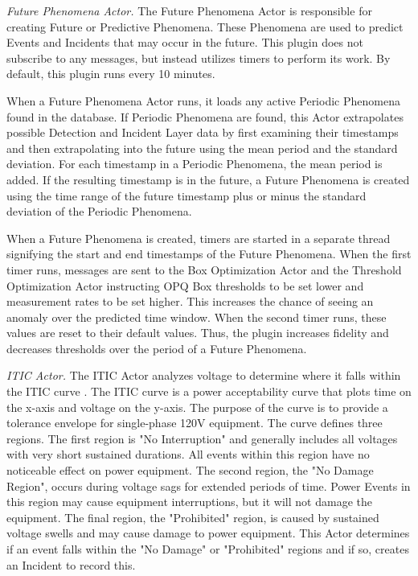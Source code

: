 {\em Future Phenomena Actor.} The Future Phenomena Actor is responsible for creating Future or Predictive Phenomena. These Phenomena are used to predict Events and Incidents that may occur in the future. This plugin does not subscribe to any messages, but instead utilizes timers to perform its work. By default, this plugin runs every 10 minutes.

When a Future Phenomena Actor runs, it loads any active Periodic Phenomena found in the database. If Periodic Phenomena are found, this Actor extrapolates possible Detection and Incident Layer data by first examining their timestamps and then extrapolating into the future using the mean period and the standard deviation. For each timestamp in a Periodic Phenomena, the mean period is added. If the resulting timestamp is in the future, a Future Phenomena is created using the time range of the future timestamp plus or minus the standard deviation of the Periodic Phenomena.

When a Future Phenomena is created, timers are started in a separate thread signifying the start and end timestamps of the Future Phenomena. When the first timer runs, messages are sent to the Box Optimization Actor and the Threshold Optimization Actor instructing OPQ Box thresholds to be set lower and measurement rates to be set higher. This increases the chance of seeing an anomaly over the predicted time window. When the second timer runs, these values are reset to their default values. Thus, the plugin increases fidelity and decreases thresholds over the period of a Future Phenomena.

{\em ITIC Actor.} The ITIC Actor analyzes voltage to determine where it falls within the ITIC curve \cite{thallam_power_2000}. The ITIC curve is a power acceptability curve that plots time on the x-axis and voltage on the y-axis.  The purpose of the curve is to provide a tolerance envelope for single-phase 120V equipment. The curve defines three regions. The first region is "No Interruption" and generally includes all voltages with very short sustained durations. All events within this region have no noticeable effect on power equipment. The second region, the "No Damage Region", occurs during voltage sags for extended periods of time. Power Events in this region may cause equipment interruptions, but it will not damage the equipment. The final region, the "Prohibited" region, is caused by sustained voltage swells and may cause damage to power equipment. This Actor determines if an event falls within the "No Damage" or "Prohibited" regions and if so, creates an Incident to record this.

